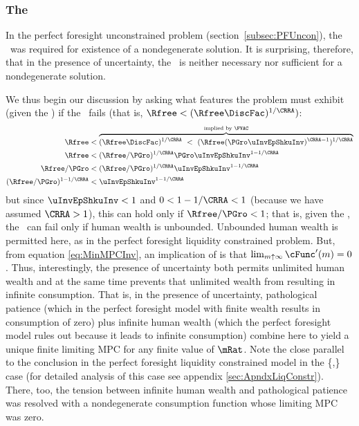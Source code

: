\documentclass[BufferStockTheory]{subfiles}
\begin{document}
\hypertarget{IntuitionRIC}{}
\subsubsection{The \RIC}

In the perfect foresight unconstrained problem
(section~\ref{subsec:PFUncon}), the \RIC~was required for existence of
a nondegenerate solution.  It is surprising, therefore, that in the
presence of uncertainty, the \RIC~is neither necessary nor sufficient
for a nondegenerate solution.
\begin{comment}
  But if the \RIC~does hold, some useful results can be derived.  Arguably
  the most fundamental are that the limiting values
  for the minimal and maximal marginal propensities to consume implicit in
  \eqref{eq:MaxMPCInv} and \eqref{eq:MinMPCInv} are positive and finite.
\end{comment}
We thus begin our discussion by asking what features the problem must
exhibit (given the \FVAC) if the \RIC~fails (that is, $\Rfree < (\Rfree \DiscFac)^{1/\CRRA})$:
\begin{align}
  \Rfree   & < \overbrace{(\Rfree \DiscFac)^{1/\CRRA} ~ < ~ (\Rfree (\PGro \uInvEpShkuInv)^{\CRRA-1})^{1/\CRRA}}^{\text{implied by \FVAC}} \notag
  \\  \Rfree   & < (\Rfree/\PGro)^{1/\CRRA}\PGro \uInvEpShkuInv^{1-1/\CRRA} \notag
  \\  \Rfree/\PGro  & < (\Rfree/\PGro)^{1/\CRRA}\uInvEpShkuInv^{1-1/\CRRA} \notag
  \\  (\Rfree/\PGro)^{1-1/\CRRA}  & < \uInvEpShkuInv^{1-1/\CRRA} \label{eq:RICimplies}
\end{align}
but since $\uInvEpShkuInv<1$ and $0 < 1-1/\CRRA < 1$ (because we have
assumed $\CRRA > 1$), this can hold only if $\Rfree/\PGro < 1$; that
is, given the \FVAC, the \RIC~can fail only if human wealth is
unbounded.  Unbounded human wealth is permitted here, as in the
perfect foresight liquidity constrained problem.  But,
from  equation
\eqref{eq:MinMPCInv}, an implication of \cncl{\RIC} is that $\lim_{m
  \uparrow \infty} \cFunc^{\prime}(m) = 0$.  Thus, interestingly,
the presence of uncertainty both permits unlimited human wealth and at
the same time prevents that unlimited wealth from resulting in
infinite consumption.  That is, in the presence of uncertainty,
pathological patience (which in the perfect foresight model with
finite wealth results in consumption of zero) plus infinite human
wealth (which the perfect foresight model rules out because it leads
to infinite consumption) combine here to yield a unique finite
limiting MPC for any finite value of $\mRat$.  Note
the close parallel to the conclusion in the perfect foresight
liquidity constrained model in the
\{\PFGIC,\cncl{\RIC}\} case (for detailed analysis of this
case see appendix \ref{sec:ApndxLiqConstr}).  There, too, the tension between infinite human wealth
and pathological patience was resolved with a nondegenerate consumption function
whose limiting MPC was zero.
\end{document}
